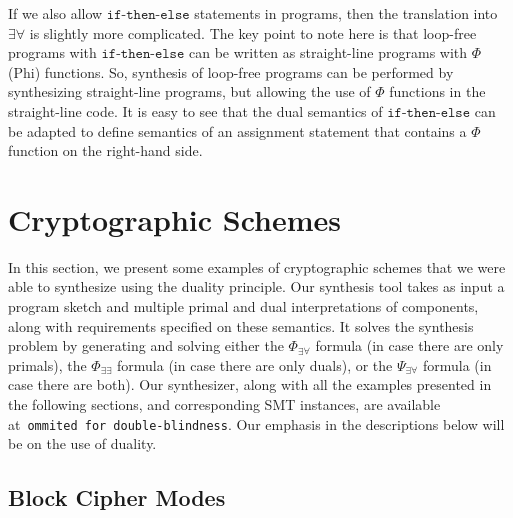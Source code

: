 \documentclass[preprint]{sig-alternate-05-2015}
\def\ite{{\texttt{if-then-else}}}
\begin{document}
{If we also allow $\ite$ statements in programs, then the
translation into $\exists\forall$ is slightly more
complicated.   The key point to note here is that
loop-free programs with $\ite$ can be written
as straight-line programs with $\Phi$ (Phi) functions.
So, synthesis of loop-free programs can be performed
by synthesizing straight-line programs, but allowing the
use of $\Phi$ functions in the straight-line code.
It is easy to see that the dual semantics of $\ite$
can be adapted to define semantics of an assignment
statement that contains a $\Phi$ function on the right-hand
side.



\endignore}


\section{Cryptographic Schemes}
\label{sec:application}

In this section, we present some examples of cryptographic schemes that we
were able to synthesize using the duality principle.
Our synthesis tool takes as input a program sketch and multiple primal 
and dual interpretations of components, along with requirements
specified on these semantics. It solves the synthesis problem by
generating and solving either 
the $\Phi_{\exists\forall}$ formula (in case there are only primals),
the $\Phi_{\exists\exists}$ formula (in case there are only duals), or the 
$\Psi_{\exists\forall}$ formula (in case there are both).
Our synthesizer, along with all the examples 
presented in the following sections,
and corresponding 
SMT instances, are available at~\texttt{ommited for double-blindness}.
Our emphasis in the descriptions below will be on the use of duality.

\subsection{Block Cipher Modes}
\end{document}
